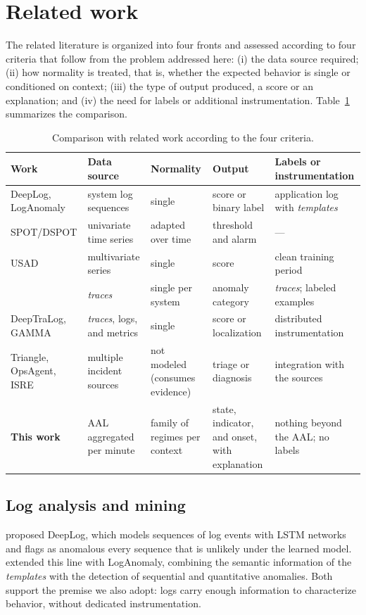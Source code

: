 \documentclass[sigconf,nonacm]{acmart}
\begin{document}
\section{Related work}\label{sec:correlatos}

The related literature is organized into four fronts and assessed according to four criteria that follow from the problem addressed here: (i) the data source required; (ii) how normality is treated, that is, whether the expected behavior is single or conditioned on context; (iii) the type of output produced, a score or an explanation; and (iv) the need for labels or additional instrumentation. Table~\ref{tab:correlatos} summarizes the comparison.

\begin{table}[t]
  \caption{Comparison with related work according to the four criteria.}
  \label{tab:correlatos}
  \small
  \begin{tabular}{p{}p{}p{}p{}p{}}
    \toprule
    Work & Data source & Normality & Output & Labels or instrumentation \\
    \midrule
    DeepLog, LogAnomaly & system log sequences & single & score or binary label & application log with \emph{templates} \\
    SPOT/DSPOT & univariate time series & adapted over time & threshold and alarm & --- \\
    USAD & multivariate series & single & score & clean training period \\
    \citet{wang2025crosssystem} & \emph{traces} & single per system & anomaly category & \emph{traces}; labeled examples \\
    DeepTraLog, GAMMA & \emph{traces}, logs, and metrics & single & score or localization & distributed instrumentation \\
    Triangle, OpsAgent, ISRE & multiple incident sources & not modeled (consumes evidence) & triage or diagnosis & integration with the sources \\
    \midrule
    \textbf{This work} & AAL aggregated per minute & family of regimes per context & state, indicator, and onset, with explanation & nothing beyond the AAL; no labels \\
    \bottomrule
  \end{tabular}
\end{table}

\subsection{Log analysis and mining}
\citet{du2017deeplog} proposed DeepLog, which models sequences of log events with LSTM networks and flags as anomalous every sequence that is unlikely under the learned model. \citet{meng2019loganomaly} extended this line with LogAnomaly, combining the semantic information of the \emph{templates} with the detection of sequential and quantitative anomalies. Both support the premise we also adopt: logs carry enough information to characterize behavior, without dedicated instrumentation.
\end{document}
